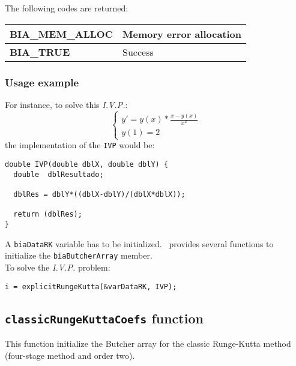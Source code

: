 The following codes are returned:
%
\begin{center}
\begin{tabular}{|l|l|}
\hline
\textbf{BIA\_MEM\_ALLOC} & Memory error allocation \\
\hline
\textbf{BIA\_TRUE} & Success \\
\hline
\end{tabular}
\end{center}

\subsubsection{Usage example}

For instance, to solve this \emph{I.V.P.}:
%
\begin{displaymath}
\left \{ \begin{array}{l}
y' = y(x) * \frac{x-y(x)}{x^2} \\
y(1) = 2
\end{array} \right.
\end{displaymath}
%
the implementation of the \texttt{IVP} would be:
%
\begin{verbatim}
double IVP(double dblX, double dblY) {
  double  dblResultado;

  dblRes = dblY*((dblX-dblY)/(dblX*dblX));

  return (dblRes);
}
\end{verbatim}
%
A \texttt{biaDataRK} variable has to be initialized. \BI \ provides several functions to initialize the \texttt{biaButcherArray} member.\\

To solve the \emph{I.V.P.} problem:
%
\begin{verbatim}
i = explicitRungeKutta(&varDataRK, IVP);  
\end{verbatim}

\subsection{\texttt{classicRungeKuttaCoefs} function}

This function initialize the Butcher array for the classic Runge-Kutta method (four-stage method and order two).\\

